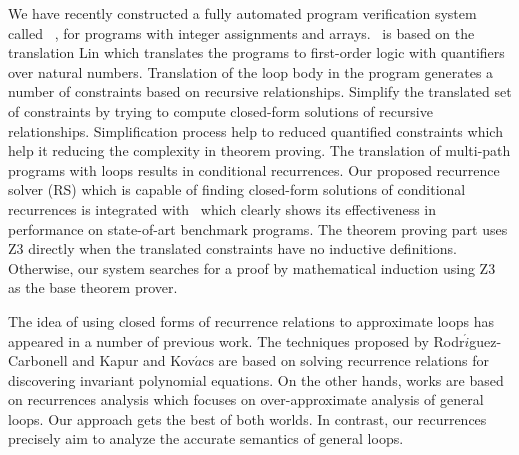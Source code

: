We have recently constructed a fully automated program verification
system called \SystemName\ \cite{DBLP:conf/synasc/pritom17,viap-array}, for programs with integer assignments and arrays. \SystemName\ is based on the translation Lin \cite{Lin20161} which translates the programs to first-order logic with quantifiers over natural numbers. Translation of the loop body in the program generates a number of constraints based on recursive relationships. Simplify the translated set of constraints by
trying to compute closed-form solutions of recursive relationships. Simplification process help to reduced quantified constraints which help it reducing the complexity in theorem proving. The translation of multi-path programs with loops results in conditional recurrences. Our proposed recurrence solver (RS) which is capable of finding closed-form solutions of conditional recurrences is integrated with \SystemName\ which clearly shows its effectiveness in performance on state-of-art benchmark programs. The theorem proving part uses Z3 directly when the translated constraints have no inductive definitions.
Otherwise, our system searches for a proof by mathematical induction using
Z3 as the base theorem prover. 

The idea of using closed forms of recurrence relations to approximate loops has appeared in a number of previous work. The techniques proposed by Rodr$\acute{i}$guez-Carbonell and Kapur \cite{rodriguez2004automatic} and Kov$\acute{a}$cs\cite{kovacs2004} are based on solving recurrence relations for discovering invariant polynomial equations. On the other hands, works \cite{farzan2015compositional,kincaid2017compositional,kincaid2017non} are based on recurrences analysis which focuses on over-approximate analysis of general loops. Our approach gets the best of both worlds. In contrast, our recurrences precisely
aim to analyze the accurate semantics of general loops.


